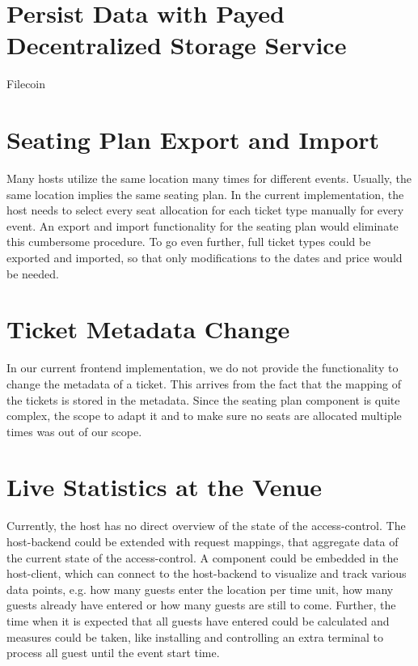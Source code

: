 \section{Persist Data with Payed Decentralized Storage Service}
Filecoin

\section{Seating Plan Export and Import}
Many hosts utilize the same location many times for different events. Usually, the same location implies the same seating plan. In the current implementation, the host needs to select every seat allocation for each ticket type manually for every event. An export and import functionality for the seating plan would eliminate this cumbersome procedure. To go even further, full ticket types could be exported and imported, so that only modifications to the dates and price would be needed.

\section{Ticket Metadata Change}
\label{future-work-ticket-metadata-change}
In our current frontend implementation, we do not provide the functionality to change the metadata of a ticket. This arrives from the fact that the mapping of the tickets is stored in the metadata. Since the seating plan component is quite complex, the scope to adapt it and to make sure no seats are allocated multiple times was out of our scope.


\section{Live Statistics at the Venue}
Currently, the host has no direct overview of the state of the access-control. The host-backend could be extended with request mappings, that aggregate data of the current state of the access-control. A component could be embedded in the host-client, which can connect to the host-backend to visualize and track various data points, e.g. how many guests enter the location per time unit, how many guests already have entered or how many guests are still to come. Further, the time when it is expected that all guests have entered could be calculated and measures could be taken, like installing and controlling an extra terminal to process all guest until the event start time.

